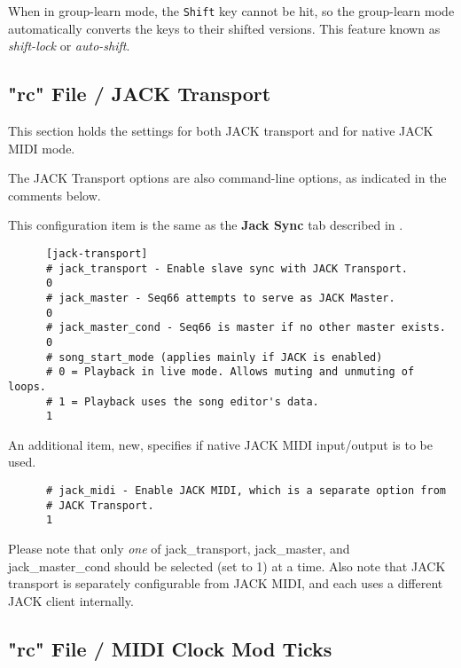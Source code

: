    When in group-learn mode, the \texttt{Shift} key cannot be hit, so the
   group-learn mode automatically converts the keys to their shifted versions.
   This feature known as \textsl{shift-lock} or \textsl{auto-shift}.

\subsection{"rc" File / JACK Transport}
\label{subsec:seq66_rc_file_jack_transport}

   This section holds the settings for both JACK transport and for native JACK
   MIDI mode.

   The JACK Transport options are also command-line options, as indicated in
   the comments below.

   This configuration item is the same as the 
   \textbf{Jack Sync} tab described in
   .

   \begin{verbatim}
      [jack-transport]
      # jack_transport - Enable slave sync with JACK Transport.
      0
      # jack_master - Seq66 attempts to serve as JACK Master.
      0
      # jack_master_cond - Seq66 is master if no other master exists.
      0
      # song_start_mode (applies mainly if JACK is enabled)
      # 0 = Playback in live mode. Allows muting and unmuting of loops.
      # 1 = Playback uses the song editor's data.
      1
   \end{verbatim}

   An additional item, new, specifies if native JACK MIDI input/output is to be
   used.

   \begin{verbatim}
      # jack_midi - Enable JACK MIDI, which is a separate option from
      # JACK Transport.
      1
   \end{verbatim}

   Please note that only \textsl{one} of
   jack\_transport, jack\_master, and jack\_master\_cond should be selected
   (set to 1) at a time.
   Also note that JACK transport is separately configurable from
   JACK MIDI, and each uses a different JACK client internally.

\subsection{"rc" File / MIDI Clock Mod Ticks}
\label{subsec:seq66_rc_file_midi_cmt}

